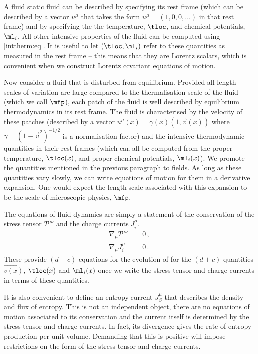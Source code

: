 A fluid static fluid can be described by specifying its rest frame (which can be described by a vector $u^\mu$ that takes the form $u^\mu=(1,0,0,\dots)$ in that rest frame) and by specifying the the temperature, $\tloc$, and chemical potentials, $\ml_i$. All other intensive properties of the fluid can be computed using \eqref{inttherm:eq}. It is useful to let $(\tloc,\ml_i)$ refer to these quantities as measured in the rest frame -- this means that they are Lorentz scalars, which is convenient when we construct Lorentz covariant equations of motion.


Now consider a fluid that is disturbed from equilibrium. Provided all length scales of variation are large compared to the thermalisation scale of the fluid (which we call $\mfp$), each patch of the fluid is well described by equilibrium thermodynamics in its rest frame. The fluid is characterised by the velocity of these patches (described by a vector $u^\mu(x)=\gamma(x)(1,\vec{v}(x))$ where $\gamma=(1-\vec{v}^2)^{-1/2}$ is a normalisation factor) and the intensive thermodynamic quantities in their rest frames (which can all be computed from the proper temperature, $\tloc(x)$, and proper chemical potentials, $\ml_i(x)$). We promote the quantities mentioned in the previous paragraph to fields. As long as these quantities vary slowly, we can write equations of motion for them in a derivative expansion. One would expect the length scale associated with this expansion to be the scale of microscopic physics, $\mfp$.

The equations of fluid dynamics are simply a statement of the conservation of the stress tensor $T^{\mu \nu}$ and the charge currents $J^\mu_i$.
%
\begin{equation}\label{Epconsv:eq} \begin{split}
  \nabla_\mu T^{\mu\nu} &%
                        = 0\,, \\
\nabla_\mu J^\mu_i &%
                        =0\,.
\end{split}
\end{equation}
%
These provide $(d+c)$ equations for the evolution of for the $(d+c)$ quantities $\vec{v(x)}$, $\tloc(x)$ and $\ml_i(x)$ once we write the stress tensor and charge currents in terms of these quantities.

It is also convenient to define an entropy current $J^\mu_S$ that describes the density and flux of entropy. This is not an independent object, there are no equations of motion associated to its conservation and the current itself is determined by the stress tensor and charge currents. In fact, its divergence gives the rate of entropy production per unit volume. Demanding that this is positive will impose restrictions on the form of the stress tensor and charge currents.

